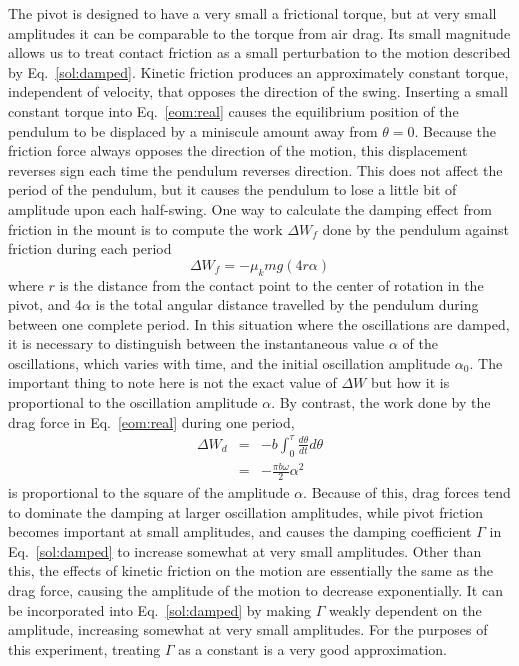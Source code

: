 \documentclass{revtex4}
\begin{document}
The pivot is designed to have a very small a frictional torque, but at very
small amplitudes it can be comparable to the torque from air drag.  Its
small magnitude allows us to treat contact friction as a small perturbation
to the motion described by Eq.~\ref{sol:damped}.  Kinetic friction produces
an approximately constant torque, independent of velocity, that opposes the
direction of the swing.  Inserting a small constant torque into
Eq.~\ref{eom:real} causes the equilibrium position of the pendulum to be
displaced by a miniscule amount away from $\theta=0$.  Because the friction
force always opposes the direction of the motion, this displacement reverses
sign each time the pendulum reverses direction.  This does not affect the
period of the pendulum, but it causes the pendulum to lose a little bit of
amplitude upon each half-swing.  One way to calculate the damping effect
from friction in the mount is to compute the work $\Delta W_f$ done by the
pendulum against friction during each period
\begin{equation}
\Delta W_f = -\mu_k m g (4r\alpha)
\label{eq:workf}
\end{equation}
where $r$ is the distance from the contact point to the center of rotation
in the pivot, and $4\alpha$ is the total angular distance travelled by the
pendulum during between one complete period. In this situation where the
oscillations are damped, it is necessary to distinguish between the 
instantaneous value $\alpha$ of the oscillations, which varies with time,
and the initial oscillation amplitude $\alpha_0$. The important thing to 
note here is not the exact value of $\Delta W$ but how it is proportional
to the oscillation amplitude $\alpha$.  By contrast, the work done by the
drag force in Eq.~\ref{eom:real} during one period,
\begin{eqnarray}
\Delta W_d &=& -b\int_0^{\tau}{\frac{d\theta}{dt}d\theta} \nonumber \\
&=& -\frac{\pi b \omega}{2} \alpha^2
\label{eq:workd}
\end{eqnarray}
is proportional to the square of the amplitude $\alpha$.  Because of this,
drag forces tend to dominate the damping at larger oscillation amplitudes,
while pivot friction becomes important at small amplitudes, and causes the
damping coefficient $\Gamma$ in Eq.~\ref{sol:damped} to increase somewhat
at very small amplitudes.  Other than this, the effects of kinetic friction
on the motion are essentially the same as the drag force, causing the
amplitude of the motion to decrease exponentially.  It can be 
incorporated into Eq.~\ref{sol:damped} by making $\Gamma$ weakly dependent
on the amplitude, increasing somewhat at very small amplitudes.  For the
purposes of this experiment, treating $\Gamma$ as a constant is a very good
approximation.
\end{document}
